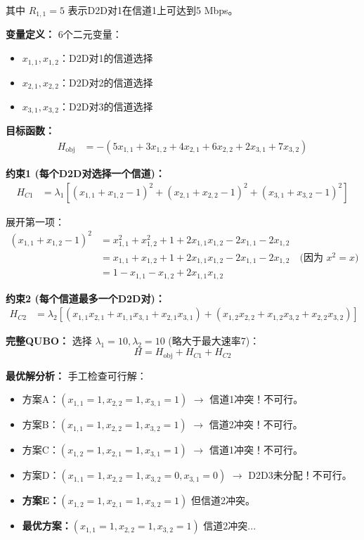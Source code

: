 \documentclass[11pt,a4paper]{article}
\begin{document}
其中 $R_{1,1}=5$ 表示D2D对1在信道1上可达到5 Mbps。

\textbf{变量定义：} 6个二元变量：
\begin{itemize}
\item $x_{1,1}, x_{1,2}$：D2D对1的信道选择
\item $x_{2,1}, x_{2,2}$：D2D对2的信道选择  
\item $x_{3,1}, x_{3,2}$：D2D对3的信道选择
\end{itemize}

\textbf{目标函数：}
\begin{align*}
H_{\text{obj}} &= -\left(5x_{1,1} + 3x_{1,2} + 4x_{2,1} + 6x_{2,2} + 2x_{3,1} + 7x_{3,2}\right)
\end{align*}

\textbf{约束1 (每个D2D对选择一个信道)：}
\begin{align*}
H_{C1} &= \lambda_1 \left[\left(x_{1,1} + x_{1,2} - 1\right)^2 + \left(x_{2,1} + x_{2,2} - 1\right)^2 + \left(x_{3,1} + x_{3,2} - 1\right)^2\right]
\end{align*}

展开第一项：
\begin{align*}
\left(x_{1,1} + x_{1,2} - 1\right)^2 &= x_{1,1}^2 + x_{1,2}^2 + 1 + 2x_{1,1}x_{1,2} - 2x_{1,1} - 2x_{1,2} \\
&= x_{1,1} + x_{1,2} + 1 + 2x_{1,1}x_{1,2} - 2x_{1,1} - 2x_{1,2} \quad \text{(因为 } x^2=x\text{)} \\
&= 1 - x_{1,1} - x_{1,2} + 2x_{1,1}x_{1,2}
\end{align*}

\textbf{约束2 (每个信道最多一个D2D对)：}
\begin{align*}
H_{C2} &= \lambda_2 \left[\left(x_{1,1}x_{2,1} + x_{1,1}x_{3,1} + x_{2,1}x_{3,1}\right) + \left(x_{1,2}x_{2,2} + x_{1,2}x_{3,2} + x_{2,2}x_{3,2}\right)\right]
\end{align*}

\textbf{完整QUBO：}
选择 $\lambda_1 = 10, \lambda_2 = 10$ (略大于最大速率7)：
\[H = H_{\text{obj}} + H_{C1} + H_{C2}\]

\textbf{最优解分析：}
手工检查可行解：
\begin{itemize}
\item 方案A：$(x_{1,1}=1, x_{2,2}=1, x_{3,1}=1)$ $\rightarrow$ 信道1冲突！不可行。
\item 方案B：$(x_{1,1}=1, x_{2,2}=1, x_{3,2}=1)$ $\rightarrow$ 信道2冲突！不可行。
\item 方案C：$(x_{1,2}=1, x_{2,1}=1, x_{3,1}=1)$ $\rightarrow$ 信道1冲突！不可行。
\item 方案D：$(x_{1,1}=1, x_{2,2}=1, x_{3,2}=0, x_{3,1}=0)$ $\rightarrow$ D2D3未分配！不可行。
\item \textbf{方案E：}$(x_{1,2}=1, x_{2,1}=1, x_{3,2}=1)$ 但信道2冲突。
\item \textbf{最优方案：}$(x_{1,1}=1, x_{2,2}=1, x_{3,2}=1)$ 信道2冲突...
\end{itemize}
\end{document}
